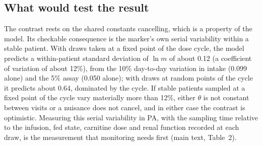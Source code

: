 \subsection{What would test the result}
\label{si:s5:test}

The contrast rests on the shared constants cancelling, which is a property of the model. Its
checkable consequence is the marker's own serial variability within a stable patient. With draws
taken at a fixed point of the dose cycle, the model predicts a within-patient standard deviation
of $\ln m$ of about 0.12 (a coefficient of variation of about 12\%), from the 10\% day-to-day
variation in intake (0.099 alone) and the 5\% assay (0.050 alone); with draws at random points of
the cycle it predicts about 0.64, dominated by the cycle. If stable patients sampled at a fixed
point of the cycle vary materially more than 12\%, either $\theta$ is not constant between visits
or a nuisance does not cancel, and in either case the contrast is optimistic. Measuring this
serial variability in PA, with the sampling time relative to the infusion, fed state, carnitine
dose and renal function recorded at each draw, is the measurement that monitoring needs first
(main text, Table~2).
